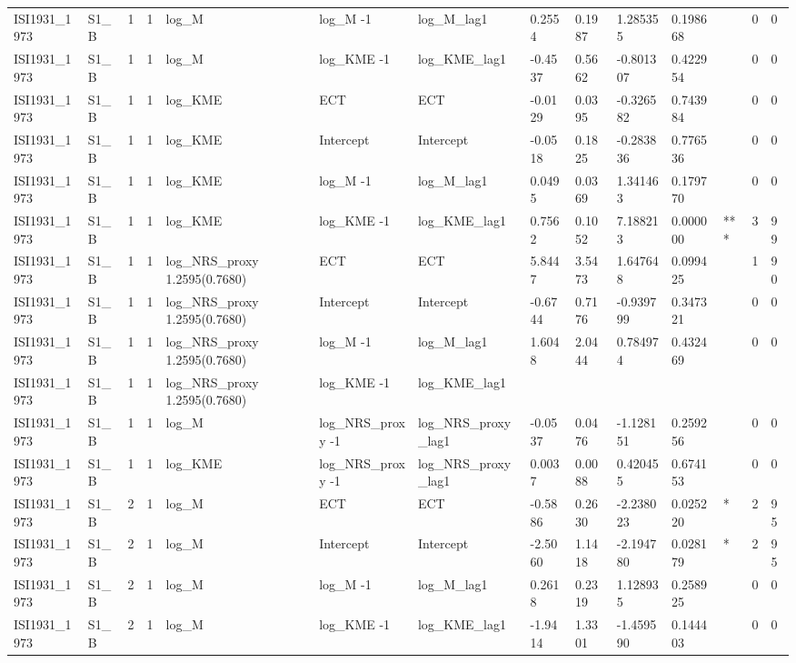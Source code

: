 \begin{tabular}{llllllllllllll}
ISI1931\_1973 & S1\_B & 1 & 1 & log\_M & log\_M -1 & log\_M\_lag1 & 0.2554 & 0.1987 & 1.285355 & 0.198668 &  & 0 & 0 \\
ISI1931\_1973 & S1\_B & 1 & 1 & log\_M & log\_KME -1 & log\_KME\_lag1 & -0.4537 & 0.5662 & -0.801307 & 0.422954 &  & 0 & 0 \\
ISI1931\_1973 & S1\_B & 1 & 1 & log\_KME & ECT & ECT & -0.0129 & 0.0395 & -0.326582 & 0.743984 &  & 0 & 0 \\
ISI1931\_1973 & S1\_B & 1 & 1 & log\_KME & Intercept & Intercept & -0.0518 & 0.1825 & -0.283836 & 0.776536 &  & 0 & 0 \\
ISI1931\_1973 & S1\_B & 1 & 1 & log\_KME & log\_M -1 & log\_M\_lag1 & 0.0495 & 0.0369 & 1.341463 & 0.179770 &  & 0 & 0 \\
ISI1931\_1973 & S1\_B & 1 & 1 & log\_KME & log\_KME -1 & log\_KME\_lag1 & 0.7562 & 0.1052 & 7.188213 & 0.000000 & *** & 3 & 99 \\
ISI1931\_1973 & S1\_B & 1 & 1 & log\_NRS\_proxy 1.2595(0.7680) & ECT & ECT & 5.8447 & 3.5473 & 1.647648 & 0.099425 &  & 1 & 90 \\
ISI1931\_1973 & S1\_B & 1 & 1 & log\_NRS\_proxy 1.2595(0.7680) & Intercept & Intercept & -0.6744 & 0.7176 & -0.939799 & 0.347321 &  & 0 & 0 \\
ISI1931\_1973 & S1\_B & 1 & 1 & log\_NRS\_proxy 1.2595(0.7680) & log\_M -1 & log\_M\_lag1 & 1.6048 & 2.0444 & 0.784974 & 0.432469 &  & 0 & 0 \\
ISI1931\_1973 & S1\_B & 1 & 1 & log\_NRS\_proxy 1.2595(0.7680) & log\_KME -1 & log\_KME\_lag1 &  &  &  &  &  &  &  \\
ISI1931\_1973 & S1\_B & 1 & 1 & log\_M & log\_NRS\_proxy -1 & log\_NRS\_proxy\_lag1 & -0.0537 & 0.0476 & -1.128151 & 0.259256 &  & 0 & 0 \\
ISI1931\_1973 & S1\_B & 1 & 1 & log\_KME & log\_NRS\_proxy -1 & log\_NRS\_proxy\_lag1 & 0.0037 & 0.0088 & 0.420455 & 0.674153 &  & 0 & 0 \\
ISI1931\_1973 & S1\_B & 2 & 1 & log\_M & ECT & ECT & -0.5886 & 0.2630 & -2.238023 & 0.025220 & * & 2 & 95 \\
ISI1931\_1973 & S1\_B & 2 & 1 & log\_M & Intercept & Intercept & -2.5060 & 1.1418 & -2.194780 & 0.028179 & * & 2 & 95 \\
ISI1931\_1973 & S1\_B & 2 & 1 & log\_M & log\_M -1 & log\_M\_lag1 & 0.2618 & 0.2319 & 1.128935 & 0.258925 &  & 0 & 0 \\
ISI1931\_1973 & S1\_B & 2 & 1 & log\_M & log\_KME -1 & log\_KME\_lag1 & -1.9414 & 1.3301 & -1.459590 & 0.144403 &  & 0 & 0 \\

\end{tabular}
